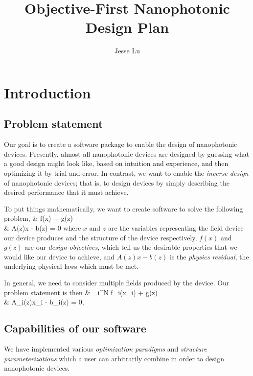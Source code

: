 \documentclass{book}
\title{Objective-First Nanophotonic Design Plan}
\author{Jesse Lu}
\begin{document}
\maketitle
\tableofcontents


\chapter{Introduction}
\section{Problem statement}
Our goal is to create a software package 
    to enable the design of nanophotonic devices.
Presently, almost all nanophotonic devices are designed
    by guessing what a good design might look like,
    based on intuition and experience,
    and then optimizing it by trial-and-error.
In contrast, we want to enable the \emph{inverse design}
    of nanophotonic devices;
    that is, to design devices by simply describing the 
    desired performance that it must achieve.

To put things mathematically, we want to create software 
    to solve the following problem,
        {\minimize&  f(x) + g(z) \\
        \subto&     A(z)x - b(z) = 0}
    where 
    \BI $x$ and $z$ are the variables representing 
            the field device our device produces and
            the structure of the device respectively,
    \I  $f(x)$ and $g(z)$ are our \emph{design objectives},
            which tell us the desirable properties 
            that we would like our device to achieve, and
    \I  $A(z)x - b(z)$ is the \emph{physics residual},
            the underlying physical laws which must be met. \EI

In general, we need to consider multiple fields produced 
    by the device.
Our problem statement is then
        {\minimize&  \sum_i^N f_i(x_i) + g(z) \\
        \subto&     A_i(z)x_i - b_i(z) = 0,\quad{}}

\section{Capabilities of our software}\label{capabilities of our software}
We have implemented various 
    \emph{optimization paradigms} and \emph{structure parameterizations}
    which a user can arbitrarily combine in order to 
    design nanophotonic devices.
\end{document}
